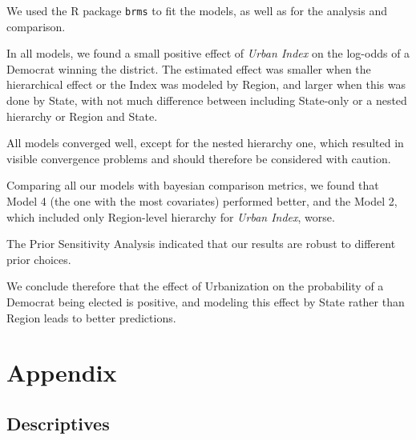 \documentclass[12pt]{article}
\begin{document}
We used the R package \verb*|brms| to fit the models, as well as for the analysis and comparison.

In all models, we found a small positive effect of \textit{Urban Index} on the log-odds of a Democrat winning the district. The estimated effect was smaller when the hierarchical effect or the Index was modeled by Region, and larger when this was done by State, with not much difference between including State-only or a nested hierarchy or Region and State.

All models converged well, except for the nested hierarchy one, which resulted in visible convergence problems and should therefore be considered with caution.

Comparing all our models with bayesian comparison metrics, we found that Model 4 (the one with the most covariates) performed better, and the Model 2, which included only Region-level hierarchy for \textit{Urban Index}, worse. 

The Prior Sensitivity Analysis indicated that our results are robust to different prior choices.

We conclude therefore that the effect of Urbanization on the probability of a Democrat being elected is positive, and modeling this effect by State rather than Region leads to better predictions.









\newpage
\appendix
\setcounter{table}{0}
\renewcommand{\thetable}{A\arabic{table}}
\setcounter{figure}{0}
\renewcommand{\thefigure}{A\arabic{figure}}

\section*{Appendix}


\subsection*{Descriptives}
\end{document}
